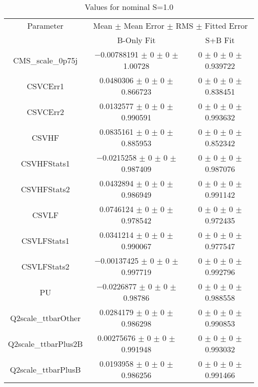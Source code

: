 \begin{table}
\centering
\caption{Values for nominal S=1.0}
\begin{tabular}{ccc}
\toprule
Parameter & \multicolumn{2}{c}{Mean $\pm$ Mean Error $\pm$ RMS $\pm$ Fitted Error}\\
 & B-Only Fit & S+B Fit\\
\midrule
CMS\_scale\_0p75j & \num{-0.00788191} $\pm$ \num{0} $\pm$ \num{0} $\pm$ \num{1.00728} & \num{0} $\pm$ \num{0} $\pm$ \num{0} $\pm$ \num{0.939722}\\
CSVCErr1 & \num{0.0480306} $\pm$ \num{0} $\pm$ \num{0} $\pm$ \num{0.866723} & \num{0} $\pm$ \num{0} $\pm$ \num{0} $\pm$ \num{0.838451}\\
CSVCErr2 & \num{0.0132577} $\pm$ \num{0} $\pm$ \num{0} $\pm$ \num{0.990591} & \num{0} $\pm$ \num{0} $\pm$ \num{0} $\pm$ \num{0.993632}\\
CSVHF & \num{0.0835161} $\pm$ \num{0} $\pm$ \num{0} $\pm$ \num{0.885953} & \num{0} $\pm$ \num{0} $\pm$ \num{0} $\pm$ \num{0.852342}\\
CSVHFStats1 & \num{-0.0215258} $\pm$ \num{0} $\pm$ \num{0} $\pm$ \num{0.987409} & \num{0} $\pm$ \num{0} $\pm$ \num{0} $\pm$ \num{0.987076}\\
CSVHFStats2 & \num{0.0432894} $\pm$ \num{0} $\pm$ \num{0} $\pm$ \num{0.986949} & \num{0} $\pm$ \num{0} $\pm$ \num{0} $\pm$ \num{0.991142}\\
CSVLF & \num{0.0746124} $\pm$ \num{0} $\pm$ \num{0} $\pm$ \num{0.978542} & \num{0} $\pm$ \num{0} $\pm$ \num{0} $\pm$ \num{0.972435}\\
CSVLFStats1 & \num{0.0341214} $\pm$ \num{0} $\pm$ \num{0} $\pm$ \num{0.990067} & \num{0} $\pm$ \num{0} $\pm$ \num{0} $\pm$ \num{0.977547}\\
CSVLFStats2 & \num{-0.00137425} $\pm$ \num{0} $\pm$ \num{0} $\pm$ \num{0.997719} & \num{0} $\pm$ \num{0} $\pm$ \num{0} $\pm$ \num{0.992796}\\
PU & \num{-0.0226877} $\pm$ \num{0} $\pm$ \num{0} $\pm$ \num{0.98786} & \num{0} $\pm$ \num{0} $\pm$ \num{0} $\pm$ \num{0.988558}\\
Q2scale\_ttbarOther & \num{0.0284179} $\pm$ \num{0} $\pm$ \num{0} $\pm$ \num{0.986298} & \num{0} $\pm$ \num{0} $\pm$ \num{0} $\pm$ \num{0.990853}\\
Q2scale\_ttbarPlus2B & \num{0.00275676} $\pm$ \num{0} $\pm$ \num{0} $\pm$ \num{0.991948} & \num{0} $\pm$ \num{0} $\pm$ \num{0} $\pm$ \num{0.993032}\\
Q2scale\_ttbarPlusB & \num{0.0193958} $\pm$ \num{0} $\pm$ \num{0} $\pm$ \num{0.986256} & \num{0} $\pm$ \num{0} $\pm$ \num{0} $\pm$ \num{0.991466}\\

\end{tabular}
\end{table}
